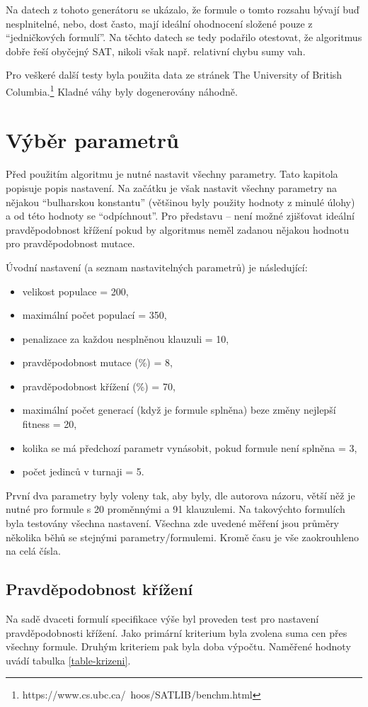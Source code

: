 \documentclass[a4paper]{article}
\begin{document}
		Na datech z tohoto generátoru se ukázalo, že formule o tomto rozsahu bývají buď nesplnitelné, nebo, dost často, mají ideální ohodnocení složené pouze z \enquote{jedničkových formulí}. Na těchto datech se tedy podařilo otestovat, že algoritmus dobře řeší obyčejný SAT, nikoli však např. relativní chybu sumy vah.
		
		Pro veškeré další testy byla použita data ze stránek The University of British Columbia.\footnote{https://www.cs.ubc.ca/~hoos/SATLIB/benchm.html} Kladné váhy byly dogenerovány náhodně.

	
\section{Výběr parametrů}
	Před použitím algoritmu je nutné nastavit všechny parametry. Tato kapitola popisuje popis nastavení. Na začátku je však nastavit všechny parametry na nějakou \enquote{bulharskou konstantu} (většinou byly použity hodnoty z minulé úlohy) a od této hodnoty se \enquote{odpíchnout}. Pro představu -- není možné zjišťovat ideální pravděpodobnost křížení pokud by algoritmus neměl zadanou nějakou hodnotu pro pravděpodobnost mutace.
	
	Úvodní nastavení (a seznam nastavitelných parametrů) je následující:
	\begin{itemize}
		\item velikost populace = 200,
		\item maximální počet populací = 350,
		\item penalizace za každou nesplněnou klauzuli = 10,
		\item pravděpodobnost mutace (\%) = 8,
		\item pravděpodobnost křížení (\%) = 70,
		\item maximální počet generací (když je formule splněna) beze změny nejlepší fitness = 20,
		\item kolika se má předchozí parametr vynásobit, pokud formule není splněna = 3,
		\item počet jedinců v turnaji = 5.
	\end{itemize}
	
	První dva parametry byly voleny tak, aby byly, dle autorova názoru, větší něž je nutné pro formule s 20 proměnnými a 91 klauzulemi. Na takovýchto formulích byla testovány všechna nastavení. Všechna zde uvedené měření jsou průměry několika běhů se stejnými parametry/formulemi. Kromě času je vše zaokrouhleno na celá čísla.
	
	\subsection{Pravděpodobnost křížení}
		Na sadě dvaceti formulí specifikace výše byl proveden test pro nastavení pravděpodobnosti křížení. Jako primární kriterium byla zvolena suma cen přes všechny formule.  Druhým kriteriem pak byla doba výpočtu. Naměřené hodnoty uvádí tabulka \ref{table-krizeni}.
		
\end{document}
